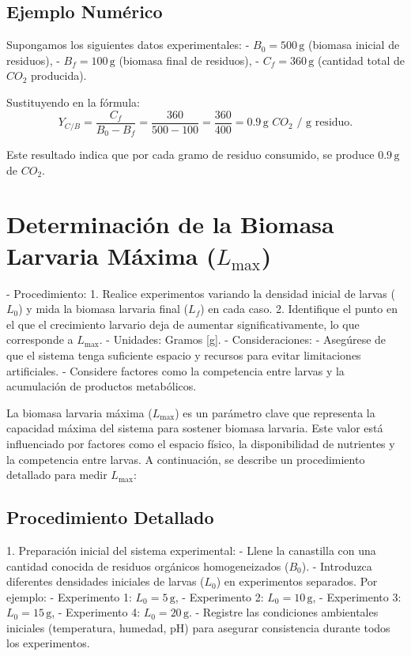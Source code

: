 \documentclass[12pt]{article}
\begin{document}
\subsection{Ejemplo Numérico}

Supongamos los siguientes datos experimentales:
- $B_0 = 500 \, \text{g}$ (biomasa inicial de residuos),
- $B_f = 100 \, \text{g}$ (biomasa final de residuos),
- $C_f = 360 \, \text{g}$ (cantidad total de $CO_2$ producida).

Sustituyendo en la fórmula:
\[
Y_{C/B} = \frac{C_f}{B_0 - B_f} = \frac{360}{500 - 100} = \frac{360}{400} = 0.9 \, \text{g $CO_2$ / g residuo}.
\]

Este resultado indica que por cada gramo de residuo consumido, se produce $0.9 \, \text{g}$ de $CO_2$.

\section{Determinación de la Biomasa Larvaria Máxima ($L_{\text{max}}$)}
- Procedimiento:
  1. Realice experimentos variando la densidad inicial de larvas ($L_0$) y mida la biomasa larvaria final ($L_f$) en cada caso.
  2. Identifique el punto en el que el crecimiento larvario deja de aumentar significativamente, lo que corresponde a $L_{\text{max}}$.
- Unidades: Gramos [g].
- Consideraciones:
  - Asegúrese de que el sistema tenga suficiente espacio y recursos para evitar limitaciones artificiales.
  - Considere factores como la competencia entre larvas y la acumulación de productos metabólicos.

  La biomasa larvaria máxima ($L_{\text{max}}$) es un parámetro clave que representa la capacidad máxima del sistema para sostener biomasa larvaria. Este valor está influenciado por factores como el espacio físico, la disponibilidad de nutrientes y la competencia entre larvas. A continuación, se describe un procedimiento detallado para medir $L_{\text{max}}$:

\subsection{Procedimiento Detallado}

1. Preparación inicial del sistema experimental:
   - Llene la canastilla con una cantidad conocida de residuos orgánicos homogeneizados ($B_0$).
   - Introduzca diferentes densidades iniciales de larvas ($L_0$) en experimentos separados. Por ejemplo:
     - Experimento 1: $L_0 = 5 \, \text{g}$,
     - Experimento 2: $L_0 = 10 \, \text{g}$,
     - Experimento 3: $L_0 = 15 \, \text{g}$,
     - Experimento 4: $L_0 = 20 \, \text{g}$.
   - Registre las condiciones ambientales iniciales (temperatura, humedad, pH) para asegurar consistencia durante todos los experimentos.
\end{document}
